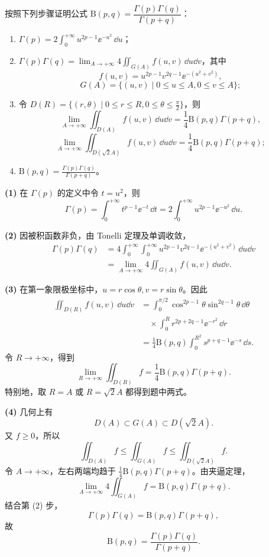 \begin{xexercise}[5]
按照下列步骤证明公式 $\mathrm{B}(p,q)=\dfrac{\Gamma(p)\Gamma(q)}{\Gamma(p+q)}$：
  \begin{enumerate}[label=(\arabic*)]
    \item $\displaystyle\Gamma(p)=2\int_0^{+\infty}u^{2p-1}\ee^{-u^2}\,\dd u$；
    \item $\displaystyle\Gamma(p)\Gamma(q)=\lim_{A\to+\infty}4\iint_{G(A)}f(u,v)\,\dd u\dd v$，其中
    \[
      f(u,v)=u^{2p-1}v^{2q-1}\ee^{-(u^2+v^2)},
    \]
    \[
      G(A)=\{(u,v)\mid0\leqslant u\leqslant A,0\leqslant v\leqslant A\};
    \]
    \item 令 $D(R)=\{(r,\theta)\mid0\leqslant r\leqslant R,0\leqslant\theta\leqslant\frac\pi2\}$，则
    \[
      \lim_{A\to+\infty}\iint_{D(A)}f(u,v)\,\dd u\dd v
      =\frac14\mathrm{B}(p,q)\Gamma(p+q),
    \]
    \[
      \lim_{A\to+\infty}\iint_{D(\sqrt2A)}f(u,v)\,\dd u\dd v
      =\frac14\mathrm{B}(p,q)\Gamma(p+q);
    \]
    \item $\displaystyle\mathrm{B}(p,q)=\frac{\Gamma(p)\Gamma(q)}{\Gamma(p+q)}$。
  \end{enumerate}
\end{xexercise}
\begin{xsolution}
\textbf{(1)} 在 $\Gamma(p)$ 的定义中令 $t=u^2$，则
\[
\Gamma(p)=\int_0^{+\infty}t^{p-1}\ee^{-t}\,\dd t
=2\int_0^{+\infty}u^{2p-1}\ee^{-u^2}\,\dd u.
\]

\textbf{(2)} 因被积函数非负，由 Tonelli 定理及单调收敛，
\[
\begin{aligned}
\Gamma(p)\Gamma(q)
&=4\int_0^{+\infty}\int_0^{+\infty}
 u^{2p-1}v^{2q-1}\ee^{-(u^2+v^2)}\,\dd u\dd v\\
&=\lim_{A\to+\infty}4\iint_{G(A)}f(u,v)\,\dd u\dd v.
\end{aligned}
\]

\textbf{(3)} 在第一象限极坐标中，$u=r\cos\theta,v=r\sin\theta$。因此
\[
\begin{aligned}
\iint_{D(R)}f(u,v)\,\dd u\dd v
&=\int_0^{\pi/2}\cos^{2p-1}\theta\sin^{2q-1}\theta\,\dd\theta\\
&\quad\times\int_0^R r^{2p+2q-1}\ee^{-r^2}\,\dd r\\
&=\frac14\mathrm{B}(p,q)
\int_0^{R^2}s^{p+q-1}\ee^{-s}\,\dd s.
\end{aligned}
\]
令 $R\to+\infty$，得到
\[
\lim_{R\to+\infty}\iint_{D(R)}f
=\frac14\mathrm{B}(p,q)\Gamma(p+q).
\]
特别地，取 $R=A$ 或 $R=\sqrt2A$ 都得到题中两式。

\textbf{(4)} 几何上有
\[
D(A)\subset G(A)\subset D(\sqrt2A).
\]
又 $f\geqslant0$，所以
\[
\iint_{D(A)}f\leqslant\iint_{G(A)}f
\leqslant\iint_{D(\sqrt2A)}f.
\]
令 $A\to+\infty$，左右两端均趋于
$\frac14\mathrm{B}(p,q)\Gamma(p+q)$。由夹逼定理，
\[
\lim_{A\to+\infty}4\iint_{G(A)}f
=\mathrm{B}(p,q)\Gamma(p+q).
\]
结合第 (2) 步，
\[
\Gamma(p)\Gamma(q)=\mathrm{B}(p,q)\Gamma(p+q),
\]
故
\[
\boxed{\mathrm{B}(p,q)=\frac{\Gamma(p)\Gamma(q)}{\Gamma(p+q)}}.
\]
\end{xsolution}


